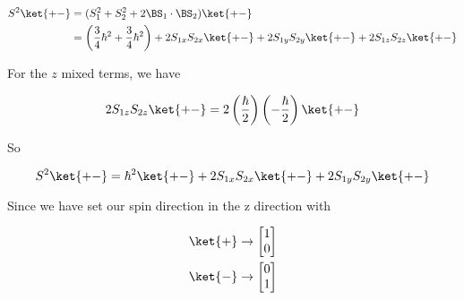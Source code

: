 \begin{align*}
S^2 \ket{+-} 
&= 
(S_1^2 + S_2^2 + 2 \BS_1 \cdot \BS_2) \ket{+-} \\
&=
\left(\frac{3}{4}\hbar^2
+\frac{3}{4}\hbar^2\right)
+ 2 S_{1x} S_{2x} \ket{+-} 
+ 2 S_{1y} S_{2y} \ket{+-} 
+ 2 S_{1z} S_{2z} \ket{+-} 
\end{align*}

For the $z$ mixed terms, we have

\begin{equation}\label{eqn:qmTwoL16:370}
2 S_{1z} S_{2z} \ket{+-}  = 
2 
\left(\frac{\hbar}{2}\right)
\left(-\frac{\hbar}{2}\right)
\ket{+-}
\end{equation}

So

\begin{equation}\label{eqn:qmTwoL16:390}
S^2\ket{+-} = 
\hbar^2 \ket{+-} 
+ 2 S_{1x} S_{2x} \ket{+-} 
+ 2 S_{1y} S_{2y} \ket{+-} 
\end{equation}

Since we have set our spin direction in the z direction with

\begin{align}\label{eqn:qmTwoL16:410}
\ket{+} &\rightarrow 
\begin{bmatrix}
1 \\
0
\end{bmatrix} \\
\ket{-} &\rightarrow 
\begin{bmatrix}
0 \\
1 
\end{bmatrix}
\end{align}

